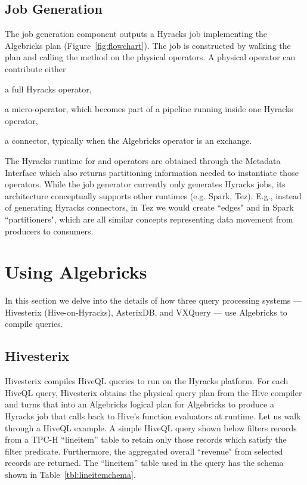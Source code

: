 \subsection{Job Generation}\label{subsec:jobgen}

The job generation component outputs a Hyracks job implementing the Algebricks plan (Figure~\ref{fig:flowchart}).
The job is constructed by walking the plan and calling the  method on the physical operators.
A physical operator can contribute either
\begin{inparaenum}[(a)]
  \item a full Hyracks operator,
  \item a micro-operator, which becomes part of a pipeline running inside one Hyracks operator,
  \item a connector, typically when the Algebricks operator is an exchange.
\end{inparaenum}
The Hyracks runtime for  and 
 operators are obtained through the Metadata Interface which also returns partitioning information needed to instantiate those operators. 
While the job generator currently only generates Hyracks jobs, its architecture conceptually supports other runtimes (e.g. Spark, Tez).
E.g., instead of generating Hyracks connectors, in Tez we would create ``edges" and in Spark ``partitioners", which are all similar concepts representing data movement from producers to consumers.


\section{Using Algebricks}
\label{sec:usage}

In this section we delve into the details of how three query processing systems --- Hivesterix (Hive-on-Hyracks), AsterixDB, and VXQuery --- use Algebricks to compile queries.

\subsection{Hivesterix}
\label{sec:hivesterix}
Hivesterix compiles HiveQL queries to run on the Hyracks platform.
For each HiveQL query, 
Hivesterix obtains the physical query plan from the Hive compiler
and turns that into an Algebricks logical plan for
Algebricks to produce a Hyracks job that calls
back to Hive's function evaluators at runtime.
Let us walk through a HiveQL example.
A simple HiveQL query shown below filters records from a TPC-H ``lineitem'' table to retain only those records which satisfy the filter predicate. 
Furthermore, the aggregated overall ``revenue" from selected records are returned. 
The ``lineitem'' table used in the query has the schema shown in Table~\ref{tbl:lineitemchema}. 

